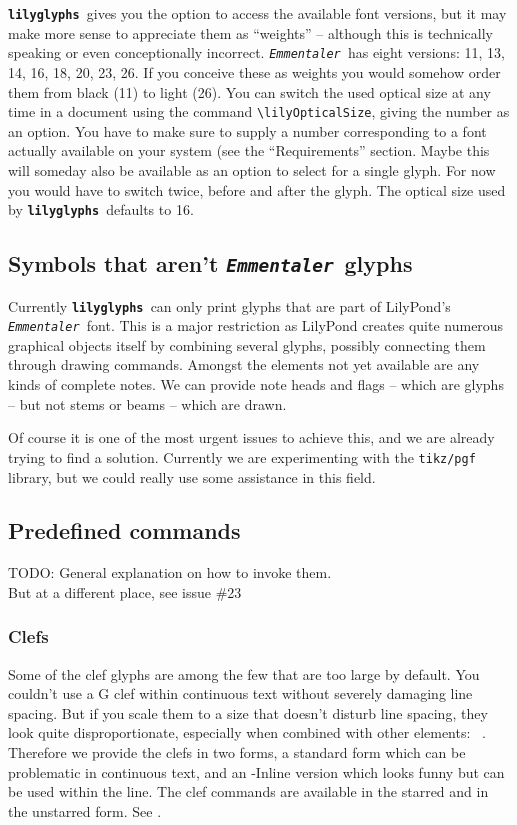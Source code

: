 \documentclass{article}
\newcommand*{\lilyglyphs}{\texttt{\textbf{lilyglyphs\,}}}
\newcommand*{\emmentaler}{\texttt{\textit{Emmentaler }}}
\newcommand*{\cmd}[1]{\texttt{\textbackslash #1}}
\begin{document}
\lilyglyphs gives you the option to access the available font versions, but it may make more sense to appreciate them as \enquote{weights} -- although this is technically speaking or even conceptionally incorrect.
\emmentaler has eight versions: 11, 13, 14, 16, 18, 20, 23, 26. 
If you conceive these as weights you would somehow order them from black (11) to light (26).
You can switch the used optical size at any time in a document using the command \cmd{lilyOpticalSize}, giving the number as an option. 
You have to make sure to supply a number corresponding to a font actually available on your system (see the \enquote{Requirements} section.
Maybe this will someday also be available as an option to select for a single glyph.
For now you would have to switch twice, before and after the glyph.
The optical size used by \lilyglyphs defaults to 16.

\subsection{Symbols that aren't \emmentaler glyphs}
\label{subsec:non-emmentaler_symbols}
Currently \lilyglyphs can only print glyphs that are part of LilyPond's \emmentaler font. 
This is a major restriction as LilyPond creates quite numerous graphical objects itself by combining several glyphs, possibly connecting them through drawing commands.
Amongst the elements not yet available are any kinds of complete notes.
We can provide note heads and flags -- which are glyphs -- but not stems or beams -- which are drawn.

Of course it is one of the most urgent issues to achieve this, and we are already trying to find a solution. 
Currently we are experimenting with the \texttt{tikz/pgf} library, but we could really use some assistance in this field.

\subsection{Predefined commands}
\label{subsec:predefined_commands}
{\color{red}TODO: General explanation on how to invoke them. \\
But at a different place, see issue \#23}

\subsubsection{Clefs}
\label{subsubsec:clefs}
Some of the clef glyphs are among the few that are too large by default. 
You couldn't use a G clef within continuous text without severely \clefG* damaging line spacing. 
But if you scale them to a size that doesn't disturb line spacing, they look quite disproportionate, especially when combined with other elements: \mbox{ \clefCInline* \natural.}
Therefore we provide the clefs in two forms, a standard form which can be problematic in continuous text, and an -Inline version which looks funny but can be used within the line.
The clef commands are available in the starred and in the unstarred form.
See .
\end{document}
